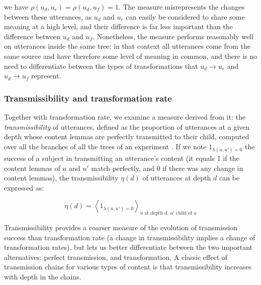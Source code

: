 \documentclass[a4paper,fleqn]{cas-dc}
\begin{document}
we have \(\rho(u_d, u_e) = \rho(u_d, u_f) = 1\). The measure
misrepresents the changes between these utterances, as \(u_d\) and
\(u_e\) can easily be considered to share some meaning at a high level,
and their difference is far less important than the difference between
\(u_d\) and \(u_f\). Nonetheless, the measure performs reasonably well
on utterances inside the same tree: in that context all utterances come
from the same source and have therefore some level of meaning in common,
and there is no need to differentiate between the types of
transformations that \(u_d \rightarrow u_e\) and \(u_d \rightarrow u_f\)
represent.

\subsubsection{Transmissibility and transformation
rate}\label{transmissibility-and-transformation-rate}

Together with transformation rate, we examine a measure derived from it:
the \emph{transmissibility} of utterances, defined as the proportion of
utterances at a given depth whose content lemmas are perfectly
transmitted to their child, computed over all the branches of all the
trees of an experiment \citep[this measure was introduced as
\enquote{average success} in][]{claidiere_cultural_2014}. If we note
\(1_{\lambda(u, u') = 0}\) the success of a subject in
transmitting an utterance's content (it equals 1 if the content lemmas
of \(u\) and \(u'\) match perfectly, and 0 if there was any change in
content lemmas), the transmissibility \(\eta(d)\) of utterances at depth
\(d\) can be expressed as:

\[\eta(d) = \left< 1_{\lambda(u, u') = 0} \right>_{\text{$u$ at depth $d$, $u'$ child of $u$}}\]

Transmissibility provides a coarser measure of the evolution of
transmission success than transformation rate (a change in
transmissibility implies a change of transformation rates), but lets us
better differentiate between the two important alternatives: perfect
transmission, and transformation. A classic effect of transmission
chains for various types of content is that transmissibility increases
with depth in the chains.
\end{document}
